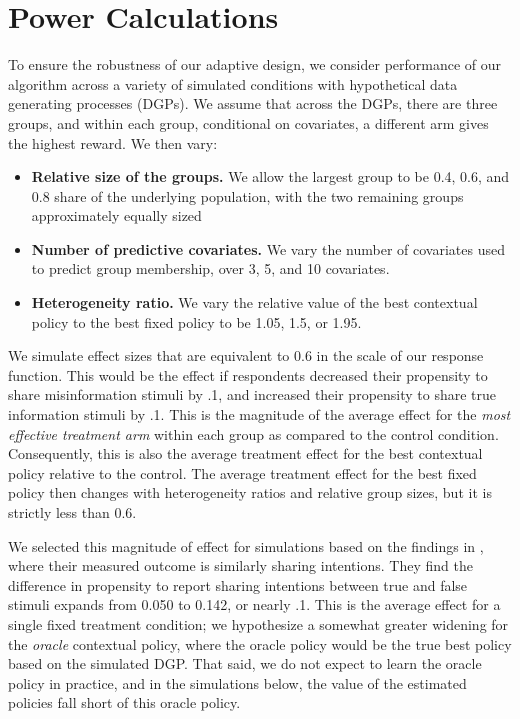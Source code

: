 \documentclass[letterpaper, 12pt, parskip=full,]{scrartcl}
\begin{document}
\section{Power Calculations}
To ensure the robustness of our adaptive design, we consider performance of our algorithm across a variety of simulated conditions with hypothetical data generating processes (DGPs). We assume that across the DGPs, there are three groups, and within each group, conditional on covariates, a different arm gives the highest reward. We then vary:
\begin{itemize}
\item \textbf{Relative size of the groups.} We allow the largest group to be 0.4, 0.6, and 0.8 share of the underlying population, with the two remaining groups approximately equally sized
\item \textbf{Number of predictive covariates.} We vary the number of covariates used to predict group membership, over 3, 5, and 10 covariates. 
\item \textbf{Heterogeneity ratio.} We vary the relative value of the best contextual policy to the best fixed policy to be 1.05, 1.5, or 1.95. 
\end{itemize}

We simulate effect sizes that are equivalent to 0.6 in the scale of our response function. This would be the effect if respondents decreased their propensity to share misinformation stimuli by .1, and increased their propensity to share true information stimuli by .1. This is the magnitude of the average effect for the \textit{most effective treatment arm} within each group as compared to the control condition. Consequently, this is also the average treatment effect for the best contextual policy relative to the control. The average treatment effect for the best fixed policy then changes with heterogeneity ratios and relative group sizes, but it is strictly less than 0.6. 

We selected this magnitude of effect for simulations based on the findings in \cite{pennycook2020fighting}, where their measured outcome is similarly sharing intentions. They find the difference in propensity to report sharing intentions between true and false stimuli expands from 0.050 to 0.142, or nearly .1. This is the average effect for a single fixed treatment condition; we hypothesize a somewhat greater widening for the \textit{oracle} contextual policy, where the oracle policy would be the true best policy based on the simulated DGP. That said, we do not expect to learn the oracle policy in practice, and in the simulations below, the value of the estimated policies fall short of this oracle policy. 
\end{document}
